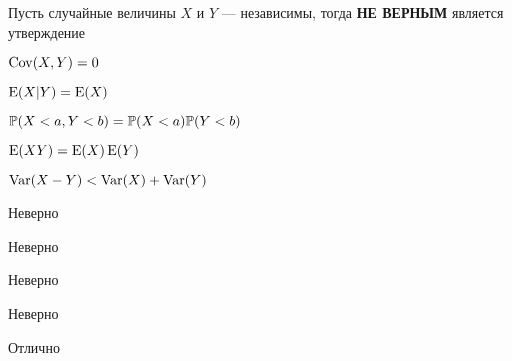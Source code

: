 
\begin{question}
Пусть случайные величины \(X\) и \(Y\) --- независимы, тогда
\textbf{НЕ ВЕРНЫМ} является утверждение
\begin{answerlist}
  \item \(\Cov(X,Y) = 0\)
  \item \(\E(X|Y)=\E(X)\)
  \item \(\P(X<a, Y<b)=\P(X<a)\P(Y<b)\)
  \item \(\E(XY)=\E(X)\E(Y)\)
  \item \(\Var(X-Y)<\Var(X)+\Var(Y)\)
\end{answerlist}
\end{question}

\begin{solution}
\begin{answerlist}
  \item Неверно
  \item Неверно
  \item Неверно
  \item Неверно
  \item Отлично
\end{answerlist}
\end{solution}

